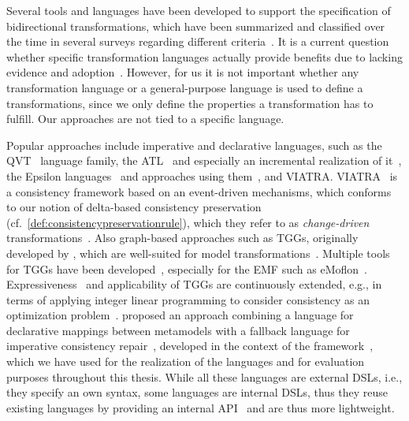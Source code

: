 Several tools and languages have been developed to support the specification of bidirectional transformations, which have been summarized and classified over the time in several surveys regarding different criteria~\cite{stevens2008LandscapeBidirectionalTransformation-GTTSE, diRuscio2012transformations-SFM, etzlstorfer2013SurveyIncrementalTransformation-ME, jakumeit2014transformationTools-SCP, samimi-dehkordi2015bidirectionalSynchronization-ICCKE, samimi-dehkordi2016iccke,hidaka2016classificationTransformations-SoSym,kahani2019SurveyTransformationTools-SoSym}.
It is a current question whether specific transformation languages actually provide benefits due to lacking evidence and adoption~\cite{burgueno2019futureTransformationLanguages-ICMT}. 
However, for us it is not important whether any transformation language or a general-purpose language is used to define a transformations, since we only define the properties a transformation has to fulfill.
Our approaches are not tied to a specific language.

Popular approaches include imperative and declarative languages, such as the \gls{QVT}~\cite{qvt} language family, the \gls{ATL}~\cite{jouault2006a,xiong2007a} and especially an incremental realization of it~\cite{martinez2017incrementalATL-SCP}, the Epsilon languages~\cite{kolovos2014epsilon-Book} and approaches using them~\cite{samidehkordi2018evlStrace-IST}, and \gls{VIATRA}.
\gls{VIATRA}~\cite{bergmann2015viatra-ICMT, varro2016viatra-SoSym} is a consistency framework based on an event-driven mechanisms, which conforms to our notion of delta-based consistency preservation (cf.\ \autoref{def:consistencypreservationrule}), which they refer to as \emph{change-driven} transformations~\cite{bergmann2012changeDriven-SoSym}.
Also graph-based approaches such as \glspl{TGG}, originally developed by \textcite{schuerr1995a},
which are well-suited for model transformations~\cite{anjorin2014EfficientSynchronizationTGG-ECMFA}.
Multiple tools for \glspl{TGG} have been developed~\cite{leblebici2014IncrementalTGGSurvey-GTVMT}, especially for the \gls{EMF} such as eMoflon~\cite{anjorin2014diss}.
Expressiveness~\cite{anjorin2012complexManipulationTGG-BX} and applicability of \glspl{TGG} are continuously extended, e.g., in terms of applying integer linear programming to consider consistency as an optimization problem~\cite{weidmann2019TGGandILP-SLE,weidmann2020TGGsAndILPSchemaCompliance-FASE}.
\citeauthor{kramer2017a} proposed an approach combining a language for declarative mappings between metamodels with a fallback language for imperative consistency repair~\cite{kramer2017a, klare2016b}, developed in the context of the \vitruv framework~\cite{klare2020Vitruv-JSS}, which we have used for the realization of the \commonalities languages and for evaluation purposes throughout this thesis.
While all these languages are external \glspl{DSL}, i.e., they specify an own syntax, some languages are internal \glspl{DSL}, thus they reuse existing languages by providing an internal \gls{API}~\cite{buchmann2018bxtend-Modelsward, hinkel2019internalTransformation-SoSym} and are thus more lightweight.

